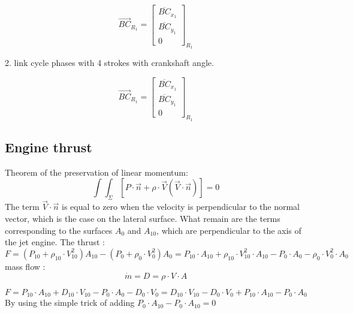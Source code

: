 \documentclass[12pt,a4paper]{article}
\begin{document}
	
	
	
	
	\[
	\overrightarrow{B C}_{R_{1}}=\left[\begin{array}{c}
		\overline{B C}_{x_{1}}  \tag{10}\\
		\overline{B C}_{y_{1}} \\
		0
	\end{array}\right]_{R_{1}}
	\]
	
	
	2. link cycle phases with 4 strokes with crankshaft angle. 

	
	\begin{equation}
		\vec{BC}_{R_{1}}=
		\begin{bmatrix}
			\overline{BC}_{x_1} \\
			\overline{BC}_{y_1}\\
			0
		\end{bmatrix}_{R_{1}} 
	\end{equation}
	
	\subsection{Engine thrust}
	Theorem of the preservation of linear momentum:
	\begin{equation}
		\int \int_{\Sigma} [P \cdot \vec{n}+ \rho \cdot \vec{V} (\vec{V} \cdot \vec{n})] = 0
	\end{equation}
	The term $\vec{V} \cdot \vec{n}$ is equal to zero when the velocity is perpendicular to the normal vector, which is the case on the lateral surface.
	What remain are the terms corresponding to the surfaces $A_0$ and $A_{10}$, which are perpendicular to the axis of the jet engine. 
	The thrust : 
	\begin{dmath}
		F = (P_{10} + \rho_{10} \cdot V_{10}^2) A_{10} - (P_{0} + \rho_{0} \cdot V_{0}^2) A_0 = P_{10} \cdot A_{10} + \rho_{10} \cdot V_{10}^2 \cdot A_{10} - P_{0} \cdot A_0 - \rho_{0} \cdot V_{0}^2 \cdot A_0
	\end{dmath}
	mass flow : 
	\begin{equation}
		\dot{m} = D = \rho \cdot V \cdot A
	\end{equation}
	
	\begin{dmath}
		F = P_{10} \cdot A_{10} + D_{10} \cdot V_{10} - P_{0} \cdot A_0 - D_{0} \cdot V_{0} = D_{10} \cdot V_{10} - D_{0} \cdot V_{0} + P_{10} \cdot A_{10} - P_{0} \cdot A_0
	\end{dmath}
	By using the simple trick of adding $P_0 \cdot A_{10} - P_0 \cdot A_{10}=0$
	
\end{document}
